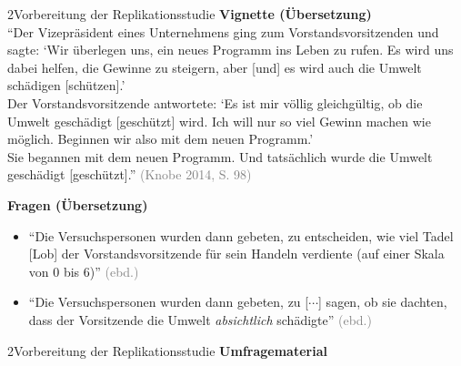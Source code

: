 \documentclass[xcolor=table,9pt,aspectratio=169]{beamer}
\begin{document}
\begin{frame}{\vspace*{10mm}2\hspace*{1em}Vorbereitung der Replikationsstudie}
\textbf{Vignette (Übersetzung)}\\
\smallskip
\enquote{Der Vizepräsident eines Unternehmens ging zum Vorstandsvorsitzenden und sagte: \enquote{Wir überlegen uns, ein neues Programm ins Leben zu rufen. Es wird uns dabei helfen, die Gewinne zu steigern, aber \textcolor{blue2}{[und]} es wird auch die Umwelt schädigen \textcolor{blue2}{[schützen]}.}\\\vspace{0.25em}
Der Vorstandsvorsitzende antwortete: \enquote{Es ist mir völlig gleichgültig, ob die Umwelt geschädigt \textcolor{blue2}{[geschützt]} wird. Ich will nur so viel Gewinn machen wie möglich. Beginnen wir also mit dem neuen Programm.}\\\vspace{0.25em}
Sie begannen mit dem neuen Programm. Und tatsächlich wurde die Umwelt geschädigt \textcolor{blue2}{[geschützt]}.} \textcolor{gray}{(Knobe 2014, S. 98)}

\bigskip
\textbf{Fragen (Übersetzung)}\\
\begin{itemize}
   \item \enquote{Die Versuchspersonen wurden dann gebeten, zu entscheiden, wie viel Tadel \textcolor{blue2}{[Lob]} der Vorstandsvorsitzende für sein Handeln verdiente (auf einer Skala von 0 bis 6)} \textcolor{gray}{(ebd.)}
   \item \enquote{Die Versuchspersonen wurden dann gebeten, zu [$\cdots$] sagen, ob sie dachten, dass der Vorsitzende die Umwelt \textit{absichtlich} schädigte} \textcolor{gray}{(ebd.)}
\end{itemize}
\end{frame}


\begin{frame}{\vspace*{10mm}2\hspace*{1em}Vorbereitung der Replikationsstudie}
\textbf{Umfragematerial}\\
\begin{center}
   \\
\end{center}
\end{frame}
\end{document}
